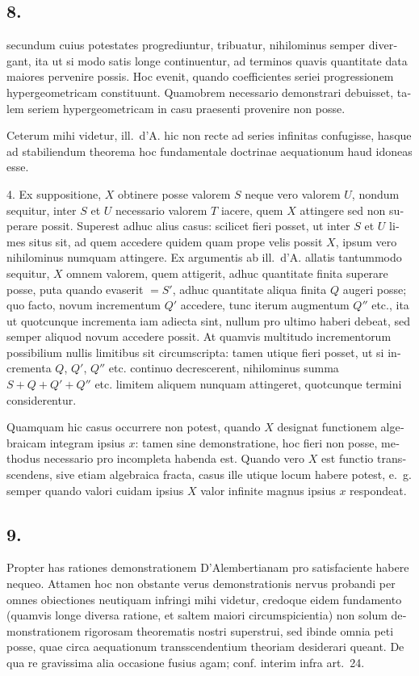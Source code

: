 \documentclass[12pt,a4paper]{article}
\begin{document}
\begin{otherlanguage}{latin}
\subsection*{8.}
secundum cuius potestates progrediuntur, tribuatur, nihilominus semper divergant, ita ut si modo satis longe continuentur, ad terminos quavis quantitate data maiores pervenire possis. Hoc evenit, quando coefficientes seriei progressionem hypergeometricam constituunt. Quamobrem necessario demonstrari debuisset, talem seriem hypergeometricam in casu praesenti provenire non posse.

Ceterum mihi videtur, ill.~d'A. hic non recte ad series infinitas confugisse, hasque ad stabiliendum theorema hoc fundamentale doctrinae aequationum haud idoneas esse.

4. Ex suppositione, $X$ obtinere posse valorem $S$ neque vero valorem $U$, nondum sequitur, inter $S$ et $U$ necessario valorem $T$ iacere, quem $X$ attingere sed non superare possit. Superest adhuc alius casus: scilicet fieri posset, ut inter $S$ et $U$ limes situs sit, ad quem accedere quidem quam prope velis possit $X$, ipsum vero nihilominus numquam attingere. Ex argumentis ab ill.~d'A. allatis tantummodo sequitur, $X$ omnem valorem, quem attigerit, adhuc quantitate finita superare posse, puta quando evaserit $=S'$, adhuc quantitate aliqua finita $Q$ augeri posse; quo facto, novum incrementum $Q'$ accedere, tunc iterum augmentum $Q''$ etc., ita ut quotcunque incrementa iam adiecta sint, nullum pro ultimo haberi debeat, sed semper aliquod novum accedere possit. At quamvis multitudo incrementorum possibilium nullis limitibus sit circumscripta: tamen utique fieri posset, ut si incrementa $Q$, $Q'$, $Q''$ etc. continuo decrescerent, nihilominus summa $S+Q+Q'+Q''$ etc. limitem aliquem nunquam attingeret, quotcunque termini considerentur.

Quamquam hic casus occurrere non potest, quando $X$ designat functionem algebraicam integram ipsius $x$: tamen sine demonstratione, hoc fieri non posse, methodus necessario pro incompleta habenda est. Quando vero $X$ est functio transscendens, sive etiam algebraica fracta, casus ille utique locum habere potest, e.~g. semper quando valori cuidam ipsius $X$ valor infinite magnus ipsius $x$ respondeat.

\subsection*{9.}
Propter has rationes demonstrationem D'Alembertianam pro satisfaciente habere nequeo. Attamen hoc non obstante verus demonstrationis nervus probandi per omnes obiectiones neutiquam infringi mihi videtur, credoque eidem fundamento (quamvis longe diversa ratione, et saltem maiori circumspicientia) non solum demonstrationem rigorosam theorematis nostri superstrui, sed ibinde omnia peti posse, quae circa aequationum transscendentium theoriam desiderari queant. De qua re gravissima alia occasione fusius agam; conf. interim infra art.~24.


\end{otherlanguage}
\end{document}
